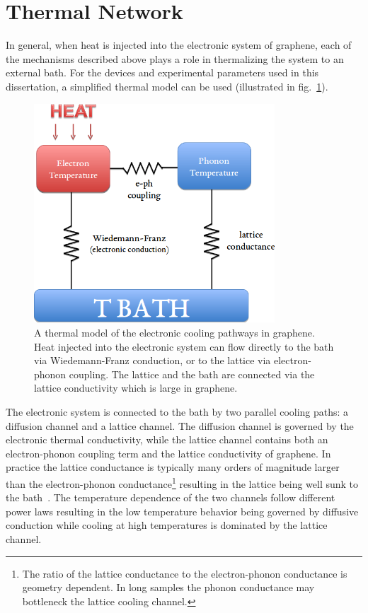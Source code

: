 \section{Thermal Network}
In general, when heat is injected into the electronic system of graphene, each of the mechanisms described above plays a role in thermalizing the system to an external bath. For the devices and experimental parameters used in this dissertation, a simplified thermal model can be used (illustrated in fig.~\ref{fig:thermal_diagram}).
\begin{figure}
\centering
\includegraphics[width = 90mm]{figures/electronic_cooling/Thermal_diagram.png}
\caption{A thermal model of the electronic cooling pathways in graphene. Heat injected into the electronic system can flow directly to the bath via Wiedemann-Franz conduction, or to the lattice via electron-phonon coupling. The lattice and the bath are connected via the lattice conductivity which is large in graphene.}
\label{fig:thermal_diagram}
\end{figure}
The electronic system is connected to the bath by two parallel cooling paths: a diffusion channel and a lattice channel. The diffusion channel is governed by the electronic thermal conductivity, while the lattice channel contains both an electron-phonon coupling term and the lattice conductivity of graphene. In practice the lattice conductance is typically many orders of magnitude larger than the electron-phonon conductance\footnote{The ratio of the lattice conductance to the electron-phonon conductance is geometry dependent. In long samples the phonon conductance may bottleneck the lattice cooling channel.} resulting in the lattice being well sunk to the bath~\cite{crossno_development_2015,fong_measurement_2013, seol_two-dimensional_2010}. The temperature dependence of the two channels follow different power laws resulting in the low temperature behavior being governed by diffusive conduction while cooling at high temperatures is dominated by the lattice channel.

